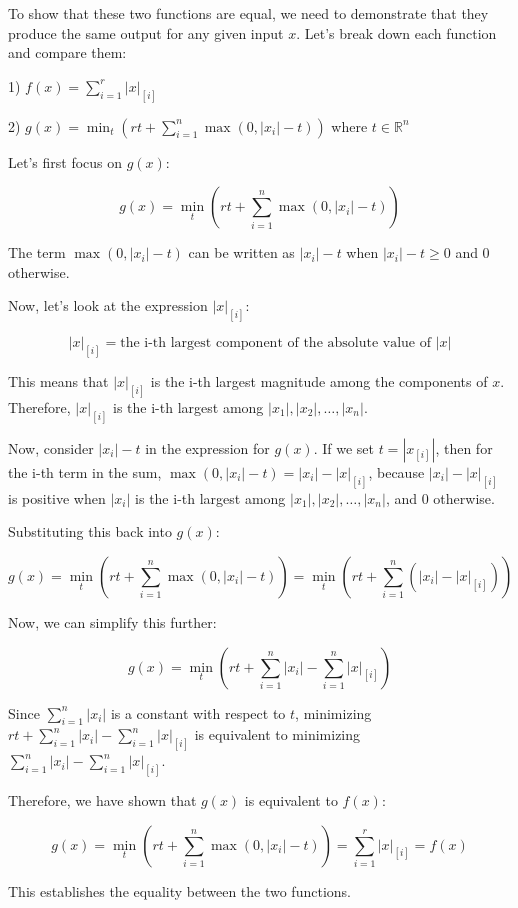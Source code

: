 To show that these two functions are equal, we need to demonstrate that they produce the same output for any given input \( x \). Let's break down each function and compare them:

1) \( f(x) = \sum_{i=1}^{r} |x|_{[i]} \)

2) \( g(x) = \min_{t} \left( rt + \sum_{i=1}^{n} \max(0, |x_{i}| - t) \right) \) where \( t \in \mathbb{R}^{n} \)

Let's first focus on \( g(x) \):

\[
g(x) = \min_{t} \left( rt + \sum_{i=1}^{n} \max(0, |x_{i}| - t) \right)
\]

The term \( \max(0, |x_{i}| - t) \) can be written as \( |x_{i}| - t \) when \( |x_{i}| - t \geq 0 \) and 0 otherwise.

Now, let's look at the expression \( |x|_{[i]} \):

\[
|x|_{[i]} = \text{the i-th largest component of the absolute value of } |x|
\]

This means that \( |x|_{[i]} \) is the i-th largest magnitude among the components of \( x \). Therefore, \( |x|_{[i]} \) is the i-th largest among \( |x_{1}|, |x_{2}|, \ldots, |x_{n}| \).

Now, consider \( |x_{i}| - t \) in the expression for \( g(x) \). If we set \( t = |x_{[i]}| \), then for the i-th term in the sum, \( \max(0, |x_{i}| - t) = |x_{i}| - |x|_{[i]} \), because \( |x_{i}| - |x|_{[i]} \) is positive when \( |x_{i}| \) is the i-th largest among \( |x_{1}|, |x_{2}|, \ldots, |x_{n}| \), and 0 otherwise.

Substituting this back into \( g(x) \):

\[
g(x) = \min_{t} \left( rt + \sum_{i=1}^{n} \max(0, |x_{i}| - t) \right) = \min_{t} \left( rt + \sum_{i=1}^{n} (|x_{i}| - |x|_{[i]}) \right)
\]

Now, we can simplify this further:

\[
g(x) = \min_{t} \left( rt + \sum_{i=1}^{n} |x_{i}| - \sum_{i=1}^{n} |x|_{[i]} \right)
\]

Since \( \sum_{i=1}^{n} |x_{i}| \) is a constant with respect to \( t \), minimizing \( rt + \sum_{i=1}^{n} |x_{i}| - \sum_{i=1}^{n} |x|_{[i]} \) is equivalent to minimizing \( \sum_{i=1}^{n} |x_{i}| - \sum_{i=1}^{n} |x|_{[i]} \).

Therefore, we have shown that \( g(x) \) is equivalent to \( f(x) \):

\[
g(x) = \min_{t} \left( rt + \sum_{i=1}^{n} \max(0, |x_{i}| - t) \right) = \sum_{i=1}^{r} |x|_{[i]} = f(x)
\]

This establishes the equality between the two functions.
